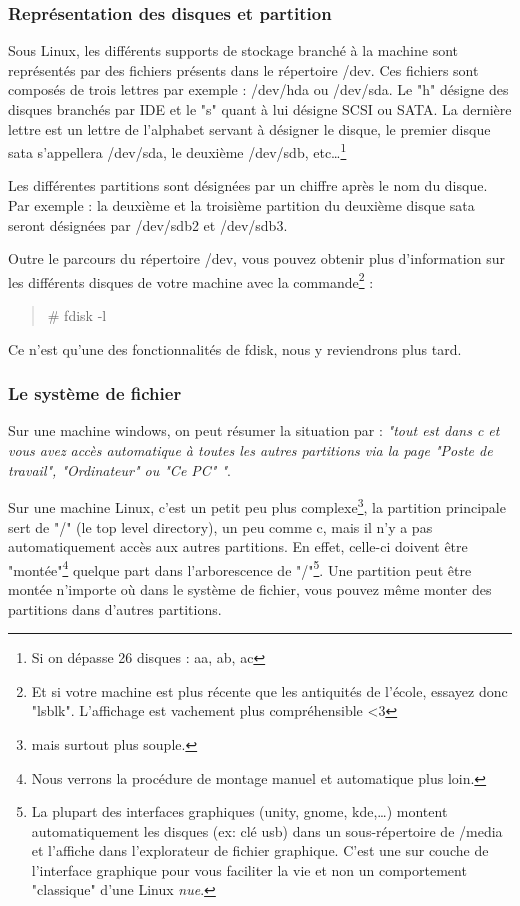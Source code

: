 \documentclass[a4paper,11pt]{article}
\newcommand{\commande}[1] {
    \begin{quote}
    \tt\raggedright #1
    \end{quote}
}
\begin{document}
\subsubsection{Représentation des disques et partition}
\par Sous Linux, les différents supports de stockage branché à la machine sont représentés par des fichiers présents dans le répertoire /dev. Ces fichiers sont composés de trois lettres par exemple : /dev/hda ou /dev/sda. Le "h" désigne des disques branchés par IDE et le "s" quant à lui désigne SCSI ou SATA. La dernière lettre est un lettre de l'alphabet servant à désigner le disque, le premier disque sata s'appellera /dev/sda, le deuxième /dev/sdb, etc\dots\footnote{Si on dépasse 26 disques : aa, ab, ac}
\par Les différentes partitions sont désignées par un chiffre après le nom du disque. Par exemple : la deuxième et la troisième partition du deuxième disque sata seront désignées par /dev/sdb2 et /dev/sdb3.
\par Outre le parcours du répertoire /dev, vous pouvez obtenir plus d'information sur les différents disques de votre machine avec la commande\footnote{Et si votre machine est plus récente que les antiquités de l'école, essayez donc "lsblk". L'affichage est vachement plus compréhensible <3} :
\commande{\# fdisk -l}
\par Ce n'est qu'une des fonctionnalités de fdisk, nous y reviendrons plus tard.

\subsubsection{Le système de fichier}
\par Sur une machine windows, on peut résumer la situation par : \emph{"tout est dans c et vous avez accès automatique à toutes les autres partitions via la page "Poste de travail", "Ordinateur" ou "Ce PC" "}.
\par Sur une machine Linux, c'est un petit peu plus complexe\footnote{mais surtout plus souple.}, la partition principale sert de "/" (le top level directory), un peu comme c, mais il n'y a pas automatiquement accès aux autres partitions. En effet, celle-ci doivent être "montée"\footnote{Nous verrons la procédure de montage manuel et automatique plus loin.} quelque part dans l'arborescence de "/"\footnote{La plupart des interfaces graphiques (unity, gnome, kde,\dots) montent automatiquement les disques (ex: clé usb) dans un sous-répertoire de /media et l'affiche dans l'explorateur de fichier graphique. C'est une sur couche de l'interface graphique pour vous faciliter la vie et non un comportement "classique" d'une Linux \emph{nue}.}. Une partition peut être montée n'importe où dans le système de fichier, vous pouvez même monter des partitions dans d'autres partitions.
\end{document}
